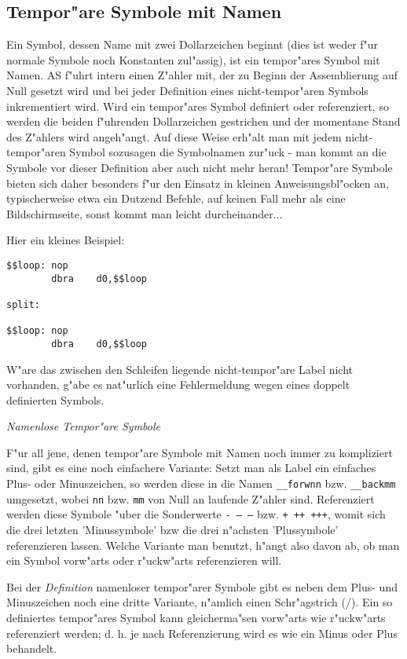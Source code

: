 \documentclass[12pt,a4paper,twoside]{report}
\begin{document}
\subsection{Tempor"are Symbole mit Namen}

Ein Symbol, dessen Name mit zwei Dollarzeichen beginnt (dies ist weder
f"ur normale Symbole noch Konstanten zul"assig), ist ein tempor"ares
Symbol mit Namen.  AS f"uhrt intern einen Z"ahler mit, der zu Beginn der
Assemblierung auf Null gesetzt wird und bei jeder Definition eines
nicht-tempor"aren Symbols inkrementiert wird.  Wird ein tempor"ares Symbol
definiert oder referenziert, so werden die beiden f"uhrenden Dollarzeichen
gestrichen und der momentane Stand des Z"ahlers wird angeh"angt.  Auf
diese Weise erh"alt man mit jedem nicht-tempor"aren Symbol sozusagen die
Symbolnamen zur"uck - man kommt an die Symbole vor dieser Definition aber
auch nicht mehr heran!  Tempor"are Symbole bieten sich daher besonders
f"ur den Einsatz in kleinen Anweisungsbl"ocken an, typischerweise etwa ein
Dutzend Befehle, auf keinen Fall mehr als eine Bildschirmseite, sonst
kommt man leicht durcheinander...

Hier ein kleines Beispiel:
\begin{verbatim}
$$loop: nop
        dbra    d0,$$loop

split:

$$loop: nop
        dbra    d0,$$loop
\end{verbatim}
W"are das zwischen den Schleifen liegende nicht-tempor"are Label nicht
vorhanden, g"abe es nat"urlich eine Fehlermeldung wegen eines doppelt
definierten Symbols.

{\em Namenlose Tempor"are Symbole}

F"ur all jene, denen tempor"are Symbole mit Namen noch immer zu
kompliziert sind, gibt es eine noch einfachere Variante: Setzt man als
Label ein einfaches Plus- oder Minuszeichen, so werden diese in die Namen
{\tt \_\_forwnn} bzw. {\tt \_\_backmm} umgesetzt, wobei {\tt nn} bzw. {\tt mm}
von Null an laufende Z"ahler sind.  Referenziert werden diese Symbole
"uber die Sonderwerte {\tt - -- ---} bzw. {\tt + ++ +++}, womit sich die
drei letzten 'Minussymbole' bzw die drei n"achsten 'Plussymbole'
referenzieren lassen.  Welche Variante man benutzt, h"angt also davon ab,
ob man ein Symbol vorw"arts oder r"uckw"arts referenzieren will.

Bei der {\em Definition} namenloser tempor"arer Symbole gibt es neben dem
Plus- und Minuszeichen noch eine dritte Variante, n"amlich einen
Schr"agstrich (/).  Ein so definiertes tempor"ares Symbol kann
gleicherma"sen vorw"arts wie r"uckw"arts referenziert werden; d. h. je
nach Referenzierung wird es wie ein Minus oder Plus behandelt.
\end{document}
